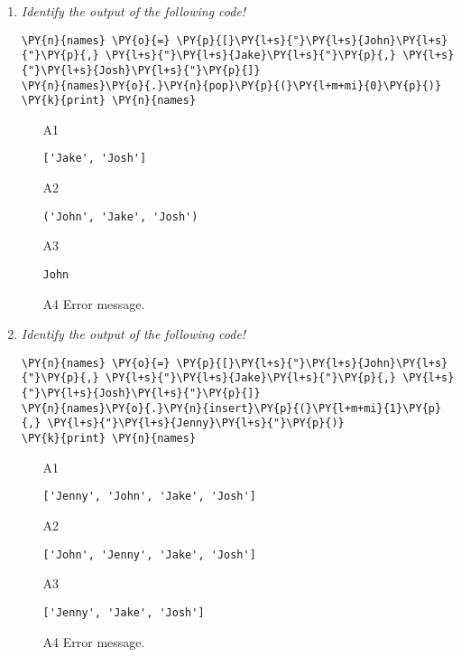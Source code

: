 \begin{enumerate}
\vspace{6mm}

\item {\em Identify the output of the following code!}\\

\begin{Verbatim}[commandchars=\\\{\}]
\PY{n}{names} \PY{o}{=} \PY{p}{[}\PY{l+s}{"}\PY{l+s}{John}\PY{l+s}{"}\PY{p}{,} \PY{l+s}{"}\PY{l+s}{Jake}\PY{l+s}{"}\PY{p}{,} \PY{l+s}{"}\PY{l+s}{Josh}\PY{l+s}{"}\PY{p}{]}
\PY{n}{names}\PY{o}{.}\PY{n}{pop}\PY{p}{(}\PY{l+m+mi}{0}\PY{p}{)}
\PY{k}{print} \PY{n}{names}
\end{Verbatim}
\vspace{6mm}

\begin{enumerate}
\item[A1] 
\begin{verbatim}
['Jake', 'Josh']
\end{verbatim}
\item[A2] 
\begin{verbatim}
('John', 'Jake', 'Josh')
\end{verbatim}
\item[A3] 
\begin{verbatim}
John
\end{verbatim}
\item[A4] Error message.
\end{enumerate}

\vspace{6mm}

\item {\em Identify the output of the following code!}\\

\begin{Verbatim}[commandchars=\\\{\}]
\PY{n}{names} \PY{o}{=} \PY{p}{[}\PY{l+s}{"}\PY{l+s}{John}\PY{l+s}{"}\PY{p}{,} \PY{l+s}{"}\PY{l+s}{Jake}\PY{l+s}{"}\PY{p}{,} \PY{l+s}{"}\PY{l+s}{Josh}\PY{l+s}{"}\PY{p}{]}
\PY{n}{names}\PY{o}{.}\PY{n}{insert}\PY{p}{(}\PY{l+m+mi}{1}\PY{p}{,} \PY{l+s}{"}\PY{l+s}{Jenny}\PY{l+s}{"}\PY{p}{)}
\PY{k}{print} \PY{n}{names}
\end{Verbatim}
\vspace{6mm}

\begin{enumerate}
\item[A1] 
\begin{verbatim}
['Jenny', 'John', 'Jake', 'Josh']
\end{verbatim}
\item[A2] 
\begin{verbatim}
['John', 'Jenny', 'Jake', 'Josh']
\end{verbatim}
\item[A3] 
\begin{verbatim}
['Jenny', 'Jake', 'Josh']
\end{verbatim}
\item[A4] Error message.
\end{enumerate}


\end{enumerate}

